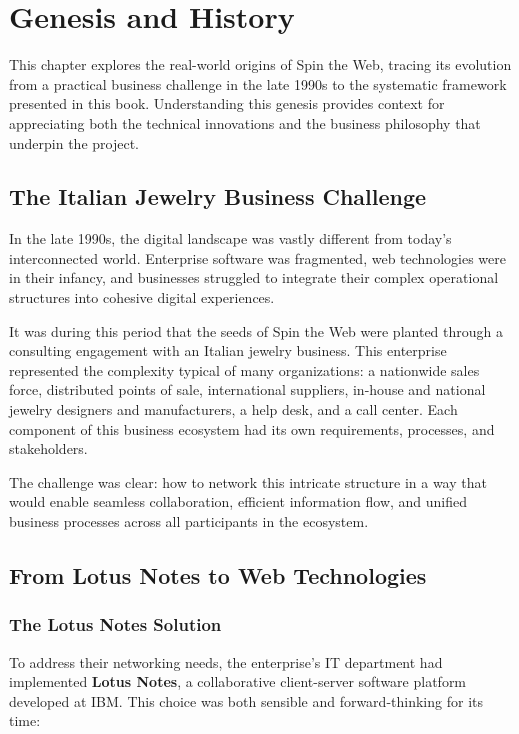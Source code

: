 \chapter{Genesis and History}
\label{chap:genesis}

This chapter explores the real-world origins of Spin the Web, tracing its evolution from a practical business challenge in the late 1990s to the systematic framework presented in this book. Understanding this genesis provides context for appreciating both the technical innovations and the business philosophy that underpin the project.

\section{The Italian Jewelry Business Challenge}

In the late 1990s, the digital landscape was vastly different from today's interconnected world. Enterprise software was fragmented, web technologies were in their infancy, and businesses struggled to integrate their complex operational structures into cohesive digital experiences.

It was during this period that the seeds of Spin the Web were planted through a consulting engagement with an Italian jewelry business. This enterprise represented the complexity typical of many organizations: a nationwide sales force, distributed points of sale, international suppliers, in-house and national jewelry designers and manufacturers, a help desk, and a call center. Each component of this business ecosystem had its own requirements, processes, and stakeholders.

The challenge was clear: how to network this intricate structure in a way that would enable seamless collaboration, efficient information flow, and unified business processes across all participants in the ecosystem.

\section{From Lotus Notes to Web Technologies}

\subsection{The Lotus Notes Solution}

To address their networking needs, the enterprise's IT department had implemented \textbf{Lotus Notes}, a collaborative client-server software platform developed at IBM. This choice was both sensible and forward-thinking for its time:

